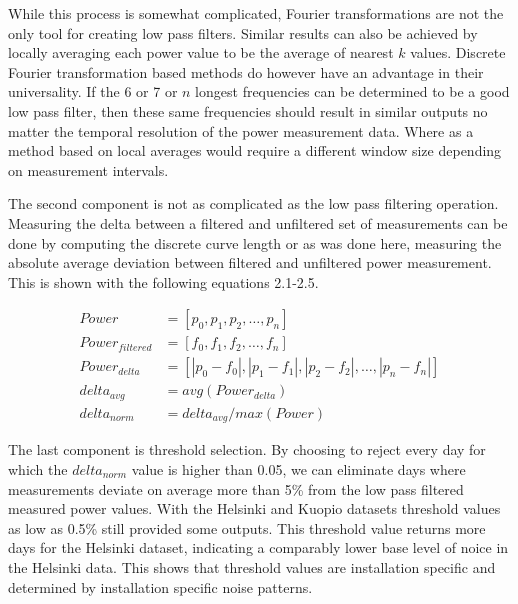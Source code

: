 
While this process is somewhat complicated, Fourier transformations are not the only tool for creating low pass filters. Similar results can also be achieved by locally averaging each power value to be the average of nearest $k$ values. Discrete Fourier transformation based methods do however have an advantage in their universality. If the 6 or 7 or $n$ longest frequencies can be determined to be a good low pass filter, then these same frequencies should result in similar outputs no matter the temporal resolution of the power measurement data. Where as a method based on local averages would require a different window size depending on measurement intervals.

The second component is not as complicated as the low pass filtering operation. Measuring the delta between a filtered and unfiltered set of measurements can be done by computing the discrete curve length or as was done here, measuring the absolute average deviation between filtered and unfiltered power measurement. This is shown with the following equations 2.1-2.5.


\begin{align}
Power &= [p_0, p_1, p_2, \dots , p_n] \\
Power_{filtered} &= [f_0, f_1, f_2, \dots , f_n] \\
Power_{delta} &= [|p_0 - f_0|, |p_1-f_1|, |p_2-f_2|, \dots , |p_n-f_n|] \\
delta_{avg} &= avg(Power_{delta}) \\
delta_{norm} &= delta_{avg}/ max(Power)
\end{align}


The last component is threshold selection. By choosing to reject every day for which the $delta_{norm}$ value is higher than 0.05, we can eliminate days where measurements deviate on average more than 5\% from the low pass filtered measured power values. With the Helsinki and Kuopio datasets threshold values as low as 0.5\% still provided some outputs. This threshold value returns more days for the Helsinki dataset, indicating a comparably lower base level of noice in the Helsinki data. This shows that threshold values are installation specific and determined by installation specific noise patterns.


